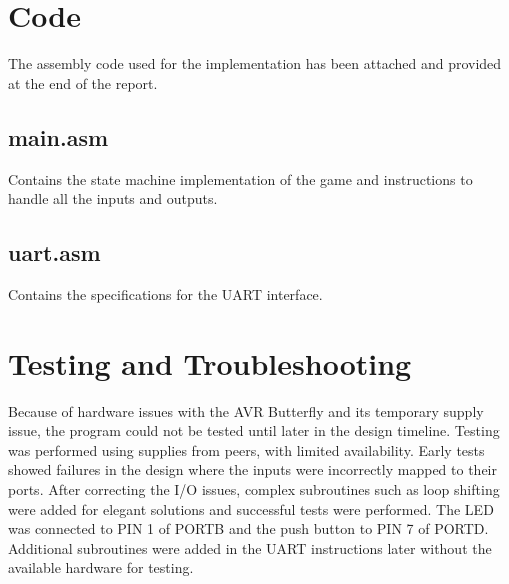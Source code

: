 \documentclass[usletter, 12pt]{article}
\begin{document}
    \section{Code} \label{sec:code}

        The assembly code used for the implementation has been attached and provided at the end of the report.

        \subsection{main.asm}
        Contains the state machine implementation of the game and instructions to handle all the inputs and outputs.

        \subsection{uart.asm}
        Contains the specifications for the UART interface.

    \section{Testing and Troubleshooting}

        Because of hardware issues with the AVR Butterfly and its temporary supply issue, the program could not be tested until later in the design timeline. Testing was performed using supplies from peers, with limited availability. Early tests showed failures in the design where the inputs were incorrectly mapped to their ports. After correcting the I/O issues, complex subroutines such as loop shifting were added for elegant solutions and successful tests were performed. The LED was connected to PIN 1 of PORTB and the push button to PIN 7 of PORTD. Additional subroutines were added in the UART instructions later without the available hardware for testing.


\end{document}

